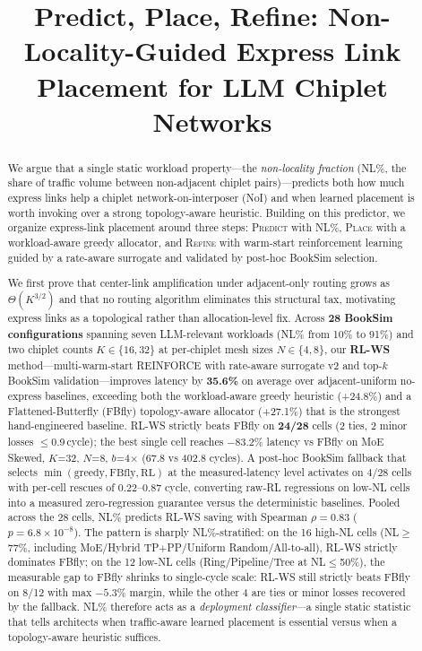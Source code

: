 \documentclass[conference]{IEEEtran}
\begin{document}
\title{Predict, Place, Refine: Non-Locality-Guided Express Link Placement for LLM Chiplet Networks}

\author{
}

\maketitle

\begin{abstract}
We argue that a single static workload property---the \textit{non-locality fraction} (NL\%, the share of traffic volume between non-adjacent chiplet pairs)---predicts both how much express links help a chiplet network-on-interposer (NoI) and when learned placement is worth invoking over a strong topology-aware heuristic. Building on this predictor, we organize express-link placement around three steps: \textsc{Predict} with NL\%, \textsc{Place} with a workload-aware greedy allocator, and \textsc{Refine} with warm-start reinforcement learning guided by a rate-aware surrogate and validated by post-hoc BookSim selection.

We first prove that center-link amplification under adjacent-only routing grows as $\Theta(K^{3/2})$ and that no routing algorithm eliminates this structural tax, motivating express links as a topological rather than allocation-level fix. Across \textbf{28 BookSim configurations} spanning seven LLM-relevant workloads (NL\% from 10\% to 91\%) and two chiplet counts $K\!\in\!\{16,32\}$ at per-chiplet mesh sizes $N\!\in\!\{4,8\}$, our \textbf{RL-WS} method---multi-warm-start REINFORCE with rate-aware surrogate v2 and top-$k$ BookSim validation---improves latency by \textbf{35.6\%} on average over adjacent-uniform no-express baselines, exceeding both the workload-aware greedy heuristic (+24.8\%) and a Flattened-Butterfly (FBfly) topology-aware allocator (+27.1\%) that is the strongest hand-engineered baseline. RL-WS strictly beats FBfly on \textbf{24/28} cells (2 ties, 2 minor losses $\le$0.9\,cycle); the best single cell reaches \textbf{$-83.2\%$} latency vs FBfly on MoE Skewed, $K$=32, $N$=8, $b$=4$\times$ (67.8 vs 402.8 cycles). A post-hoc BookSim fallback that selects $\min(\text{greedy}, \text{FBfly}, \text{RL})$ at the measured-latency level activates on $4/28$ cells with per-cell rescues of $0.22$--$0.87$ cycle, converting raw-RL regressions on low-NL cells into a measured zero-regression guarantee versus the deterministic baselines. Pooled across the 28 cells, NL\% predicts RL-WS saving with Spearman $\rho{=}0.83$ ($p=6.8\times 10^{-8}$). The pattern is sharply NL\%-stratified: on the 16 high-NL cells (NL$\ge$77\%, including MoE/Hybrid TP+PP/Uniform Random/All-to-all), RL-WS strictly dominates FBfly; on the 12 low-NL cells (Ring/Pipeline/Tree at NL$\le$50\%), the measurable gap to FBfly shrinks to single-cycle scale: RL-WS still strictly beats FBfly on 8/12 with max $-5.3\%$ margin, while the other 4 are ties or minor losses recovered by the fallback. NL\% therefore acts as a \textit{deployment classifier}---a single static statistic that tells architects when traffic-aware learned placement is essential versus when a topology-aware heuristic suffices.
\end{abstract}
\end{document}
